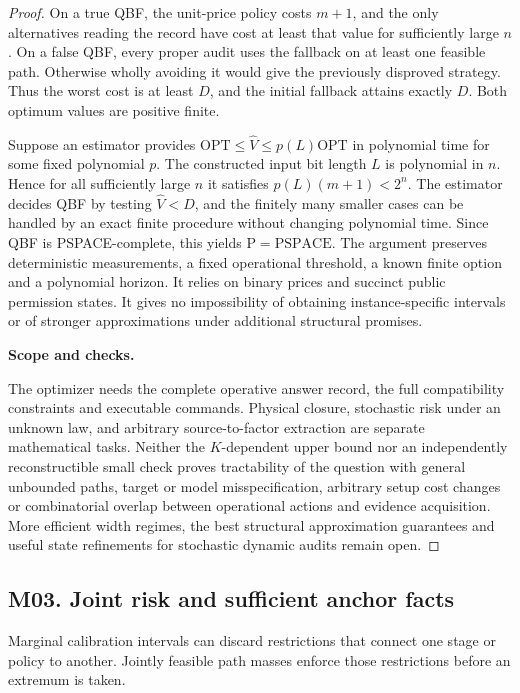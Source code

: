 \begin{proof}
On a true QBF, the unit-price policy costs \(m+1\), and the only alternatives reading the record have cost at least that value for sufficiently large \(n\). On a false QBF, every proper audit uses the fallback on at least one feasible path. Otherwise wholly avoiding it would give the previously disproved strategy. Thus the worst cost is at least \(D\), and the initial fallback attains exactly \(D\). Both optimum values are positive finite.

Suppose an estimator provides \(\mathrm{OPT}\le\hat V\le p(L)\mathrm{OPT}\) in polynomial time for some fixed polynomial \(p\). The constructed input bit length \(L\) is polynomial in \(n\). Hence for all sufficiently large \(n\) it satisfies \(p(L)(m+1)<2^n\). The estimator decides QBF by testing \(\hat V<D\), and the finitely many smaller cases can be handled by an exact finite procedure without changing polynomial time. Since QBF is PSPACE-complete, this yields \(\mathrm P=\mathrm{PSPACE}\). The argument preserves deterministic measurements, a fixed operational threshold, a known finite option and a polynomial horizon. It relies on binary prices and succinct public permission states. It gives no impossibility of obtaining instance-specific intervals or of stronger approximations under additional structural promises.

\textbf{Scope and checks.}

The optimizer needs the complete operative answer record, the full compatibility constraints and executable commands. Physical closure, stochastic risk under an unknown law, and arbitrary source-to-factor extraction are separate mathematical tasks. Neither the \(K\)-dependent upper bound nor an independently reconstructible small check proves tractability of the question with general unbounded paths, target or model misspecification, arbitrary setup cost changes or combinatorial overlap between operational actions and evidence acquisition. More efficient width regimes, the best structural approximation guarantees and useful state refinements for stochastic dynamic audits remain open.

\end{proof}

\subsection{M03. Joint risk and sufficient anchor facts}

\label{ext:m03}

Marginal calibration intervals can discard restrictions that connect one stage or policy to another. Jointly feasible path masses enforce those restrictions before an extremum is taken.

